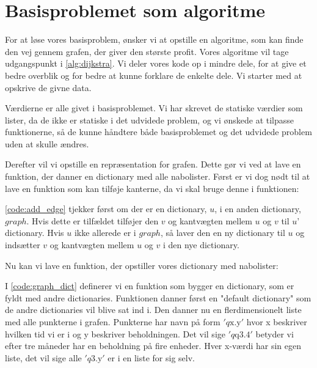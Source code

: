 \section{Basisproblemet som algoritme}
For at løse vores basisproblem, ønsker vi at opstille en algoritme, som kan finde den vej gennem grafen, der giver den største profit. Vores algoritme vil tage udgangspunkt i \autoref{alg:dijkstra}. Vi deler vores kode op i mindre dele, for at give et bedre overblik og for bedre at kunne forklare de enkelte dele. Vi starter med at opskrive de givne data. 



Værdierne er alle givet i basisproblemet. Vi har skrevet de statiske værdier som lister, da de ikke er statiske i det udvidede problem, og vi ønskede at tilpasse funktionerne, så de kunne håndtere både basisproblemet og det udvidede problem uden at skulle ændres. 

Derefter vil vi opstille en repræsentation for grafen. Dette gør vi ved at lave en funktion, der danner en dictionary med alle nabolister. Først er vi dog nødt til at lave en funktion som kan tilføje kanterne, da vi skal bruge denne i funktionen:



\autoref{code:add_edge} tjekker først om der er en dictionary, $u$, i en anden dictionary, $graph$. Hvis dette er tilfældet tilføjer den $v$ og kantvægten mellem $u$ og $v$ til  $u$' dictionary. Hvis $u$ ikke allerede er i $graph$, så laver den en ny dictionary til $u$ og indsætter $v$ og kantvægten mellem $u$ og $v$ i den nye dictionary.

Nu kan vi lave en funktion, der opstiller vores dictionary med nabolister:



I \autoref{code:graph_dict} definerer vi en funktion som bygger en dictionary, som er fyldt med andre dictionaries. Funktionen danner først en "default dictionary" som de andre dictionaries vil blive sat ind i.
Den danner nu en flerdimensionelt liste med alle punkterne i grafen. Punkterne har navn på form $'q\textrm{x.y}'$ hvor x beskriver hvilken tid vi er i og y beskriver beholdningen. Det vil sige $'q\textrm{q3.4}'$ betyder vi efter tre måneder har en beholdning på fire enheder. Hver x-værdi har sin egen liste, det vil sige alle $'q\textrm{3.y}'$ er i en liste for sig selv.

